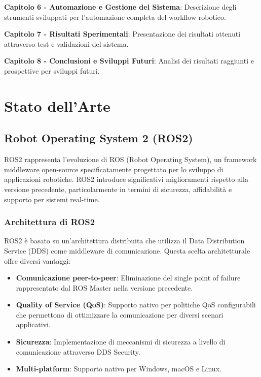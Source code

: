 \documentclass[12pt,a4paper,twoside,openright]{book}
\begin{document}
\textbf{Capitolo 6 - Automazione e Gestione del Sistema}: Descrizione degli strumenti sviluppati per l'automazione completa del workflow robotico.

\textbf{Capitolo 7 - Risultati Sperimentali}: Presentazione dei risultati ottenuti attraverso test e validazioni del sistema.

\textbf{Capitolo 8 - Conclusioni e Sviluppi Futuri}: Analisi dei risultati raggiunti e prospettive per sviluppi futuri.

\chapter{Stato dell'Arte}
\label{chap:stato-arte}

\section{Robot Operating System 2 (ROS2)}

ROS2 rappresenta l'evoluzione di ROS (Robot Operating System), un framework middleware open-source specificatamente progettato per lo sviluppo di applicazioni robotiche. ROS2 introduce significativi miglioramenti rispetto alla versione precedente, particolarmente in termini di sicurezza, affidabilità e supporto per sistemi real-time.

\subsection{Architettura di ROS2}

ROS2 è basato su un'architettura distribuita che utilizza il Data Distribution Service (DDS) come middleware di comunicazione. Questa scelta architetturale offre diversi vantaggi:

\begin{itemize}
    \item \textbf{Comunicazione peer-to-peer}: Eliminazione del single point of failure rappresentato dal ROS Master nella versione precedente.
    \item \textbf{Quality of Service (QoS)}: Supporto nativo per politiche QoS configurabili che permettono di ottimizzare la comunicazione per diversi scenari applicativi.
    \item \textbf{Sicurezza}: Implementazione di meccanismi di sicurezza a livello di comunicazione attraverso DDS Security.
    \item \textbf{Multi-platform}: Supporto nativo per Windows, macOS e Linux.
\end{itemize}
\end{document}
